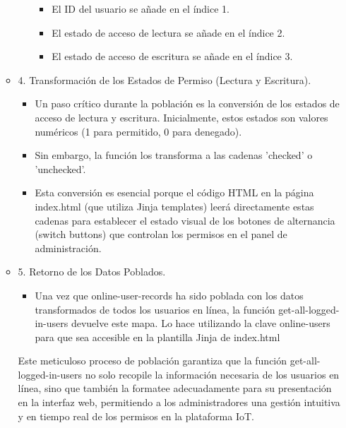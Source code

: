 \documentclass{report}
\begin{document}
\begin{itemize}
\begin{itemize}
\begin{itemize}
\begin{itemize}
                        \item El ID del usuario se añade en el índice 1.
                        \item El estado de acceso de lectura se añade en el índice 2.
                        \item El estado de acceso de escritura se añade en el índice 3.                        
                    \end{itemize}
                \end{itemize}
            \item 4. Transformación de los Estados de Permiso (Lectura y Escritura).
            \begin{itemize}
                \item Un paso crítico durante la población es la conversión de los estados de acceso de lectura y escritura. Inicialmente, estos estados son 
                valores numéricos (1 para permitido, 0 para denegado).
                \item Sin embargo, la función los transforma a las cadenas 'checked' o 'unchecked'.
                \item Esta conversión es esencial porque el código HTML en la página index.html (que utiliza Jinja templates) leerá directamente estas cadenas 
                para establecer el estado visual de los botones de alternancia (switch buttons) que controlan los permisos en el panel de administración.        
            \end{itemize}
            
            \item 5. Retorno de los Datos Poblados.
            \begin{itemize}
                \item Una vez que online-user-records ha sido poblada con los datos transformados de todos los usuarios en línea, la función 
                get-all-logged-in-users devuelve este mapa. Lo hace utilizando la clave online-users para que sea accesible en la plantilla Jinja de 
                index.html        
            \end{itemize}
    
            Este meticuloso proceso de población garantiza que la función get-all-logged-in-users no solo recopile la información necesaria de los usuarios 
            en línea, sino que también la formatee adecuadamente para su presentación en la interfaz web, permitiendo a los administradores una gestión 
            intuitiva y en tiempo real de los permisos en la plataforma IoT.
        \end{itemize}


\end{itemize}
\end{document}
